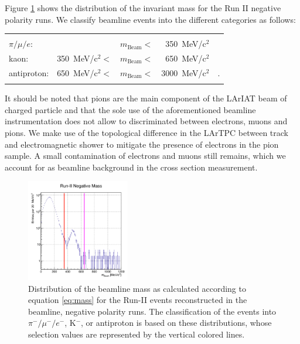 \documentclass[aps,prl,twocolumn,showpacs,superscriptaddress,groupedaddress]{revtex4}  %
\begin{document}
Figure \ref{fig:mass} shows the distribution of the invariant mass for the Run II negative polarity runs. We classify beamline events into the different categories as follows:

\begin{tabular}{lllrl}
& & & &\\
 $\pi/\mu/e$: &                               & $m_{\text{Beam}}<$& 350~MeV/c$^2$&\\
 kaon:           & 350~MeV/c$^2 <$ & $m_{\text{Beam}}<$& 650~MeV/c$^2$&\\
 antiproton:   & 650~MeV/c$^2 <$ & $m_{\text{Beam}}<$& 3000~MeV/c$^2$&.\\
& & & &\\
\end{tabular}



It should be noted that pions are the main component of the LArIAT beam of charged particle and that the sole use of the aforementioned beamline instrumentation does not allow to discriminated between electrons, muons and pions. We make use of the topological difference in the LArTPC between track and electromagnetic shower to mitigate the presence of electrons in the pion sample. A small contamination of electrons and muons still remains, which we account for as beamline background in the cross section measurement.

\begin{figure}
  \centering  
\includegraphics[width =0.4\textwidth]{massRunII.png}
\caption{Distribution of the beamline mass as calculated according to equation \ref{eq:mass} for the Run-II events reconstructed in the beamline, negative polarity runs. The classification of the events into $\pi^-/ \mu^-/e^-$, K$^-$, or antiproton is based on these distributions, whose selection values are represented by the vertical colored lines.}
\label{fig:mass}
\end{figure}
\end{document}
